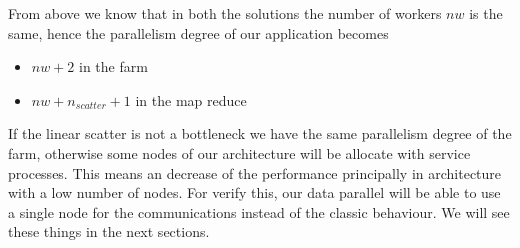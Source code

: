 From above we know that in both the solutions the number of workers $nw$ is the same, hence the parallelism degree of our application becomes
\begin{itemize}
\item $nw+2$ in the farm
\item $nw+n_{scatter}+1$ in the map reduce
\end{itemize}
If the linear scatter is not a bottleneck we have the same parallelism degree of the farm, otherwise some nodes of our architecture will be allocate with service processes. This means an decrease of the performance principally in architecture with a low number of nodes. For verify this, our data parallel will be able to use a single node for the communications instead of the classic behaviour. We will see these things in the next sections.